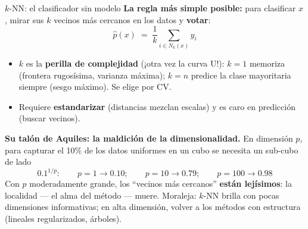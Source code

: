 \documentclass{beamer}
\newcommand{\1}{\mathbb{I}}
\begin{document}
\begin{frame}{$k$-NN: el clasificador sin modelo}
\small
\textbf{La regla más simple posible:} para clasificar $x$, mirar sus $k$ vecinos más cercanos en los datos y \textbf{votar}:
\[ \hat{p}(x) \;=\; \frac{1}{k} \sum_{i \in N_k(x)} y_i \]
\pause

\begin{itemize}\itemsep4pt
  \item $k$ es la \textbf{perilla de complejidad} (¡otra vez la curva U!): $k = 1$ memoriza (frontera rugosísima, varianza máxima); $k = n$ predice la clase mayoritaria siempre (sesgo máximo). Se elige por CV.
  \item Requiere \textbf{estandarizar} (distancias mezclan escalas) y es caro en predicción (buscar vecinos). \pause
\end{itemize}

\vspace{0.15cm}
\textbf{Su talón de Aquiles: la maldición de la dimensionalidad.} En dimensión $p$, para capturar el 10\% de los datos uniformes en un cubo se necesita un sub-cubo de lado
\[ 0.1^{1/p}: \qquad p = 1 \rightarrow 0.10; \qquad p = 10 \rightarrow 0.79; \qquad p = 100 \rightarrow 0.98 \]
\pause
Con $p$ moderadamente grande, los ``vecinos más cercanos'' \textbf{están lejísimos}: la localidad --- el alma del método --- muere. Moraleja: $k$-NN brilla con pocas dimensiones informativas; en alta dimensión, volver a los métodos con estructura (lineales regularizados, árboles).
\end{frame}
\end{document}

